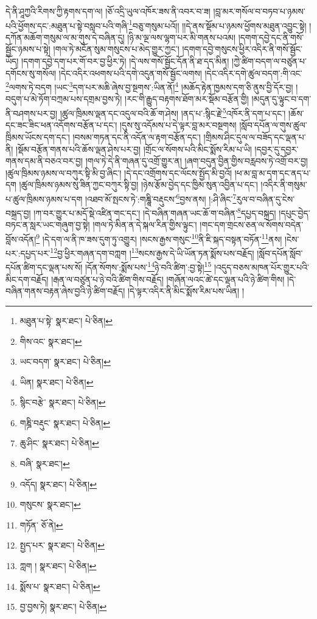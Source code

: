 དེ་ནི་ཤཱཀྱའི་རིགས་ཀྱི་རྟགས་དག་ལ། །ཅོ་འདྲི་ཡུལ་འཁོར་ཟས་ནི་འབར་བ་ཟ། །བླ་མར་གསོལ་བ་བཏབ་པ་ཉམས་པའི་ཕྱོགས་དང་:མཐུན་པ་སྟེ་བསླབ་པའི་གཞི་\footnote{མཐུན་པ་སྟེ་  སྣར་ཐང་།  པེ་ཅིན། }བཅུ་གསུམ་པའོ།། །།དེ་ནས་སྡོམ་པ་ཉམས་ཕྱོགས་མཐུན་འབྱུང་སྟེ། །དཀོན་མཆོག་གསུམ་ལ་མ་གུས་དེ་བཞིན་དུ། །ཉི་མ་ལྔ་ལས་ལྷག་པར་མི་གནས་པའམ། །དགག་དབྱེ་དང་ནི་གསོ་སྦྱོང་ཉམས་པ་སྟེ། །གལ་ཏེ་མངོན་སུམ་གསུངས་པ་མེད་གྱུར་ཀྱང་། །དགག་དབྱེ་གསུངས་ཕྱིར་འདིར་ནི་གསོ་སྦྱོང་ཡོད། །དགག་དབྱེ་དག་པར་གོ་བར་བྱ་ཕྱིར་ཏེ། །དེ་ལས་གསོ་སྦྱོང་དོན་ནི་ཐ་དད་མིན། །ཀྱེ་ཚིག་བདག་ལ་བཙུན་པ་དགོངས་སུ་གསོལ། །དེང་འདིར་འཕགས་པའི་དགེ་འདུན་གསོ་སྦྱོང་ལགས། །དེང་འདིར་དགེ་ཚུལ་བདག་:གི་འང་\footnote{གིས་འང་  སྣར་ཐང་། }ལགས་ཏེ་བདག །ཡང་\footnote{ཡང་བདག་  སྣར་ཐང་།  པེ་ཅིན། }དག་པར་མཆི་ཞེས་བྱ་སྔགས་:ཡིན་ནོ།\footnote{ཡིན།  སྣར་ཐང་།  པེ་ཅིན། } །མཆོད་རྟེན་ཁྱམས་དག་ཅི་ནུས་བྱི་དོར་བྱ། །བདུག་པ་མེ་ཏོག་བཀྲམ་པས་དགྲམ་བྱས་ཏེ། །རང་གི་རྒྱུད་བརྟགས་ཐོག་མར་སྡོམ་བརྩོན་གྱི། །མདུན་དུ་ལྟུང་བ་དག་ནི་བཤགས་པར་བྱ། །ཚུལ་ཁྲིམས་ལྡན་དང་འདུལ་བའི་ཆོ་ག་ཤེས། །ནད་པ་:སྙིང་རྗེ་\footnote{སྙིང་བརྩེ་  སྣར་ཐང་།  པེ་ཅིན། }འཁོར་ནི་དག་པ་དང་། །ཆོས་དང་ཟང་ཟིང་ཕན་འདོགས་བརྩོན་པ་དང་། །དུས་སུ་འདོམས་པ་དེ་ལྟར་བླ་མར་བསྔགས། །སློབ་དཔོན་ལ་གུས་ཚུལ་ཁྲིམས་ཡོངས་དག་དང་། །བསམ་གཏན་དང་ནི་འདོན་ལ་རྟག་བརྩོན་དང་། །གྲིམས་ཤིང་དུལ་ལ་བཟོད་དང་ལྡན་པ་ནི། །སྡོམ་བརྩོན་གནས་པའི་ཆོས་ལྡན་ཤེས་པར་བྱ། །གྲོང་ལ་སོགས་པའི་མིང་སྨོས་རིམ་པ་ཡི། །དབྱར་དུ་དབྱར་གནས་དམ་ནི་བཅའ་བར་བྱ། །གལ་ཏེ་དེ་ནི་གཞན་དུ་འགྲོ་གྱུར་ན། །ཞག་བདུན་བྱིན་གྱིས་བརླབས་ཏེ་འགྲོ་བར་བྱ། །ཚུལ་ཁྲིམས་ཉམས་ལ་བཀུར་སྟི་མི་བྱ་ཞིང་། །དེ་དང་འགྲོགས་དང་ལོངས་སྤྱོད་མི་བྱའོ། །ཕ་མ་བླ་མ་དག་དང་ནད་པ་དག །ཚུལ་ཁྲིམས་ཉམས་སུ་ཟིན་ཀྱང་བཀུར་སྟི་བྱ། །ཉེས་རྩོམ་བྱེད་དང་ཁྱིམ་སུན་འབྱིན་པ་དང་། །འདིར་ནི་གསུམ་པ་ཚུལ་ཁྲིམས་ཉམས་པ་དག །འཐབ་མོ་སྤངས་ཏེ་:གཎྜཱི་བརྡུངས་\footnote{གཎྜི་བརྡུང་  སྣར་ཐང་།  པེ་ཅིན། }བྱས་ནས། །:ཤི་ཞིང་\footnote{ཆུ་ཤིང་  སྣར་ཐང་།  པེ་ཅིན། }རུལ་བ་བཞིན་དུ་ངེས་བསྐྲད་བྱ། །ཀ་བར་གྱུར་པ་མདོ་སྡེ་འཛིན་གང་དང་། །དེ་བཞིན་གཞན་ཡང་ཆོ་ག་བཞིན་\footnote{བཞི་  སྣར་ཐང་། }དཔྱད་བསྐྲད། །དཔུང་བྱེད་བཏང་ན་སླར་ཡང་གཞུག་བྱ་སྟེ། །གལ་ཏེ་མིན་ན་དེ་སྐལ་རིན་གྱིས་ལྟུང་། །གང་དག་གྲངས་ཅན་ལ་སོགས་བདེན་བློས་འདོན།\footnote{འདོད།  སྣར་ཐང་།  པེ་ཅིན། } །དེ་དག་ལ་ནི་ཁ་ཟས་དུག་ཏུ་འགྱུར། །སངས་རྒྱས་གསུང་\footnote{གསུངས་  སྣར་ཐང་། }ནི་ཇི་སྐད་བསྟན་བཏོན་\footnote{གཏོན་  ཅོ་ནེ། }ནས། །ངེས་པར་:དཔྱད་པར་\footnote{སྤྱད་པར་  སྣར་ཐང་།  པེ་ཅིན། }བྱ་ཕྱིར་གཞན་དག་བཀླག །\footnote{ཀླག །  སྣར་ཐང་།  པེ་ཅིན། }སངས་རྒྱས་དེ་ཡི་ཡོན་ཏན་སྨོས་པས་བརྗོད། །སློབ་དཔོན་སློབ་དཔོན་ཚིག་དང་ལྡན་པས་སོ། །དོན་སོགས་:སྨོས་པས་\footnote{སྨོས་པ་  སྣར་ཐང་།  པེ་ཅིན། }ཉེ་བའི་ཚིག་:བྱ་སྟེ།\footnote{བྱ་བྱས་ཏེ།  སྣར་ཐང་།  པེ་ཅིན། } །འདུད་བཅས་མཁན་པོར་གྱུར་པའི་མིང་དག་བརྗོད། །རྒན་ལ་བཙུན་པ་ཉེ་བའི་ཚིག་གིས་བརྗོད། །གཞོན་ལའང་ཚེ་དང་ལྡན་པའི་ཉེ་ཚིག་གིས། །དེ་བཞིན་གནས་བརྟན་ཞེས་བྱའི་ཉེ་ཚིག་བརྗོད། །དེ་ལྟར་འདིར་ནི་མིང་སྨོས་རིམ་པས་ཡིན། །
